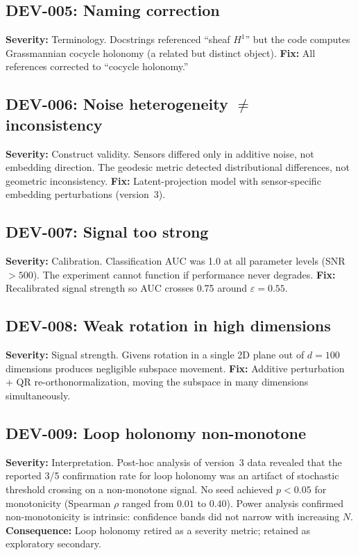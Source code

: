 \documentclass[11pt]{article}
\newcommand{\eps}{\varepsilon}
\begin{document}
\subsection*{DEV-005: Naming correction}
\textbf{Severity:} Terminology.
Docstrings referenced ``sheaf $H^1$'' but the code computes
Grassmannian cocycle holonomy (a related but distinct object).
\textbf{Fix:} All references corrected to ``cocycle holonomy.''

\subsection*{DEV-006: Noise heterogeneity $\neq$ inconsistency}
\textbf{Severity:} Construct validity.
Sensors differed only in additive noise, not embedding direction.
The geodesic metric detected distributional differences, not
geometric inconsistency.
\textbf{Fix:} Latent-projection model with sensor-specific
embedding perturbations (version~3).

\subsection*{DEV-007: Signal too strong}
\textbf{Severity:} Calibration.
Classification AUC was 1.0 at all parameter levels (SNR $> 500$).
The experiment cannot function if performance never degrades.
\textbf{Fix:} Recalibrated signal strength so AUC crosses 0.75
around $\eps = 0.55$.

\subsection*{DEV-008: Weak rotation in high dimensions}
\textbf{Severity:} Signal strength.
Givens rotation in a single 2D plane out of $d = 100$ dimensions
produces negligible subspace movement.
\textbf{Fix:} Additive perturbation + QR re-orthonormalization,
moving the subspace in many dimensions simultaneously.

\subsection*{DEV-009: Loop holonomy non-monotone}
\textbf{Severity:} Interpretation.
Post-hoc analysis of version~3 data revealed that the reported
3/5 confirmation rate for loop holonomy was an artifact of
stochastic threshold crossing on a non-monotone signal.  No seed
achieved $p < 0.05$ for monotonicity (Spearman $\rho$ ranged from
$0.01$ to $0.40$).  Power analysis confirmed non-monotonicity is
intrinsic: confidence bands did not narrow with increasing $N$.
\textbf{Consequence:} Loop holonomy retired as a severity metric;
retained as exploratory secondary.
\end{document}
